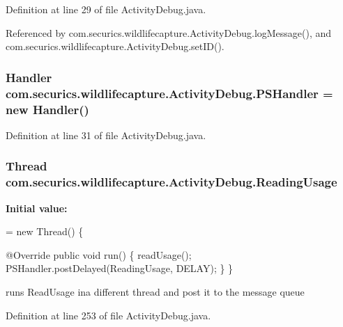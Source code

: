 Definition at line 29 of file Activity\+Debug.\+java.



Referenced by com.\+securics.\+wildlifecapture.\+Activity\+Debug.\+log\+Message(), and com.\+securics.\+wildlifecapture.\+Activity\+Debug.\+set\+I\+D().

\subsubsection[{P\+S\+Handler}]{\setlength{\rightskip}{0pt plus 5cm}Handler com.\+securics.\+wildlifecapture.\+Activity\+Debug.\+P\+S\+Handler = new Handler()\hspace{0.3cm}{\ttfamily [private]}}\label{classcom_1_1securics_1_1wildlifecapture_1_1_activity_debug_a243498b3b6ae19cfc20d40740337d4b4}


Definition at line 31 of file Activity\+Debug.\+java.

\subsubsection[{Reading\+Usage}]{\setlength{\rightskip}{0pt plus 5cm}Thread com.\+securics.\+wildlifecapture.\+Activity\+Debug.\+Reading\+Usage\hspace{0.3cm}{\ttfamily [private]}}\label{classcom_1_1securics_1_1wildlifecapture_1_1_activity_debug_afa40c245f83351b1991359f39f574fe0}
{\bfseries Initial value\+:}
\begin{DoxyCode}
= \textcolor{keyword}{new} Thread() \{

        @Override
        \textcolor{keyword}{public} \textcolor{keywordtype}{void} run() \{
            readUsage();
            PSHandler.postDelayed(ReadingUsage, DELAY);
        \}       
    \}
\end{DoxyCode}
runs Read\+Usage ina different thread and post it to the message queue 

Definition at line 253 of file Activity\+Debug.\+java.



